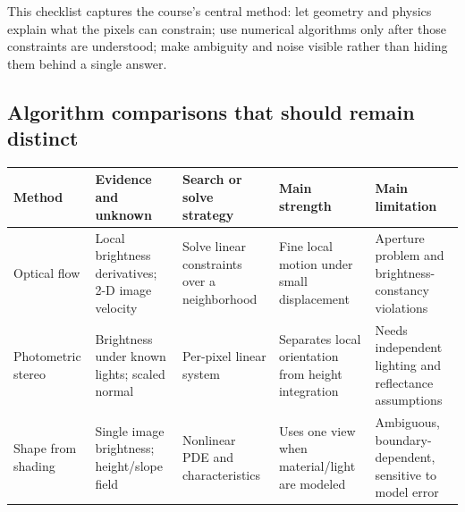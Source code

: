 This checklist captures the course's central method: let geometry and physics explain what the pixels can constrain; use numerical algorithms only after those constraints are understood; make ambiguity and noise visible rather than hiding them behind a single answer.

\subsection{Algorithm comparisons that should remain distinct}\label{04-visual-computing-ii-ch034-algorithm-comparisons-that-should-remain-distinct}

{\def\LTcaptype{none} %
\begin{longtable}[]{@{}
  >{\raggedright\arraybackslash}p{}
  >{\raggedright\arraybackslash}p{}
  >{\raggedright\arraybackslash}p{}
  >{\raggedright\arraybackslash}p{}
  >{\raggedright\arraybackslash}p{}@{}}
\toprule\noalign{}
\begin{minipage}[b]{\linewidth}\raggedright
Method
\end{minipage} & \begin{minipage}[b]{\linewidth}\raggedright
Evidence and unknown
\end{minipage} & \begin{minipage}[b]{\linewidth}\raggedright
Search or solve strategy
\end{minipage} & \begin{minipage}[b]{\linewidth}\raggedright
Main strength
\end{minipage} & \begin{minipage}[b]{\linewidth}\raggedright
Main limitation
\end{minipage} \\
\midrule\noalign{}
\endhead
\bottomrule\noalign{}
\endlastfoot
Optical flow & Local brightness derivatives; 2-D image velocity & Solve linear constraints over a neighborhood & Fine local motion under small displacement & Aperture problem and brightness-constancy violations \\
Photometric stereo & Brightness under known lights; scaled normal & Per-pixel linear system & Separates local orientation from height integration & Needs independent lighting and reflectance assumptions \\
Shape from shading & Single image brightness; height/slope field & Nonlinear PDE and characteristics & Uses one view when material/light are modeled & Ambiguous, boundary-dependent, sensitive to model error \\

\end{longtable}}
